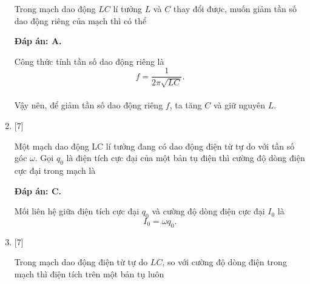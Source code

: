 \begin{enumerate}[label=\bfseries Câu \arabic*:]
	\cauhoi
	{Trong mạch dao động  $LC$ lí tưởng $L$ và $C$ thay đổi được, muốn giảm tần số dao động riêng của mạch thì có thể
	}
	
	\loigiai
	{		\textbf{Đáp án: A.}
		
		Công thức tính tần số dao động riêng là
		$$
		f = \dfrac{1}{2\pi \sqrt{LC}}.
		$$ \\
		Vậy nên, để giảm tần số dao động riêng $f$, ta tăng $C$ và giữ nguyên $L$.
	}

	\item {} [7] %
	
	\cauhoi
	{Một mạch dao động LC lí tưởng đang có dao động điện từ tự do với tần số góc $\omega$. Gọi $q_0$ là điện tích cực đại của một bản tụ điện thì cường độ dòng điện cực đại trong mạch là
	}
	
	\loigiai
	{		\textbf{Đáp án: C.}
		
		Mối liên hệ giữa điện tích cực đại $q_0$ và cường độ dòng điện cực đại $I_0$ là
		$$
		I_0 = \omega q_0.
		$$
		
	}	

	\item {} [7] %
	
	\cauhoi
	{Trong mạch dao động điện từ tự do $LC$, so với cường độ dòng điện trong mạch thì điện tích trên một bản tụ luôn
	}
	

\end{enumerate}
